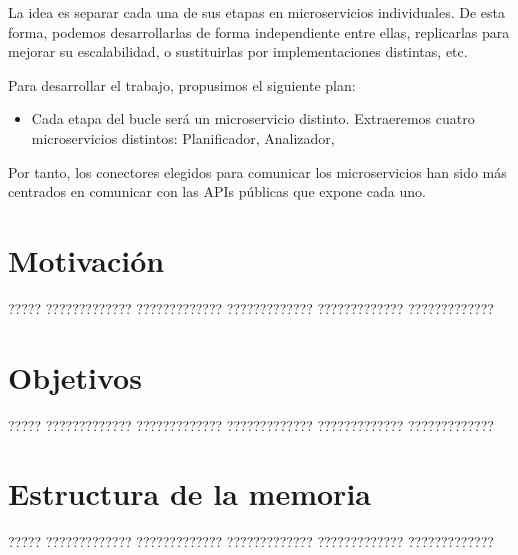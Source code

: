 
La idea es separar cada una de sus etapas en microservicios individuales. De esta forma, podemos desarrollarlas de forma independiente entre ellas, replicarlas para mejorar su escalabilidad, o sustituirlas por implementaciones distintas, etc.

Para desarrollar el trabajo, propusimos el siguiente plan:
\begin{itemize}
  \item Cada etapa del bucle será un microservicio distinto. Extraeremos cuatro microservicios distintos: Planificador, Analizador,
\end{itemize}

Por tanto, los conectores elegidos para comunicar los microservicios han sido más centrados en comunicar con las APIs públicas que expone cada uno.

\section{Motivación}

????? ????????????? ????????????? ????????????? ????????????? ?????????????

\section{Objetivos}

????? ????????????? ????????????? ????????????? ????????????? ?????????????

\section{Estructura de la memoria}

????? ????????????? ????????????? ????????????? ????????????? ?????????????


